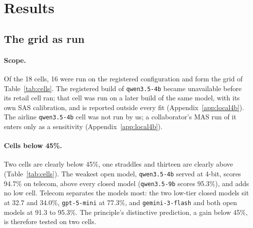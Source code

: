 \section{Results}
\label{sec:results}

\subsection{The grid as run}
\label{sec:compliance}

\paragraph{Scope.} Of the 18 cells, 16 were run on the registered configuration and form the grid of Table~\ref{tab:cells}. The registered build of \texttt{qwen3.5-4b} became unavailable before its retail cell ran; that cell was run on a later build of the same model, with its own SAS calibration, and is reported outside every fit (Appendix~\ref{app:local4b}). The airline \texttt{qwen3.5-4b} cell was not run by us; a collaborator's MAS run of it enters only as a sensitivity (Appendix~\ref{app:local4b}).

\paragraph{Cells below 45\%.} Two cells are clearly below 45\%, one straddles and thirteen are clearly above (Table~\ref{tab:cells}). The weakest open model, \texttt{qwen3.5-4b} served at 4-bit, scores 94.7\% on telecom, above every closed model (\texttt{qwen3.5-9b} scores 95.3\%), and adds no low cell. Telecom separates the models most: the two low-tier closed models sit at 32.7 and 34.0\%, \texttt{gpt-5-mini} at 77.3\%, and \texttt{gemini-3-flash} and both open models at 91.3 to 95.3\%. The principle's distinctive prediction, a gain below 45\%, is therefore tested on two cells.


